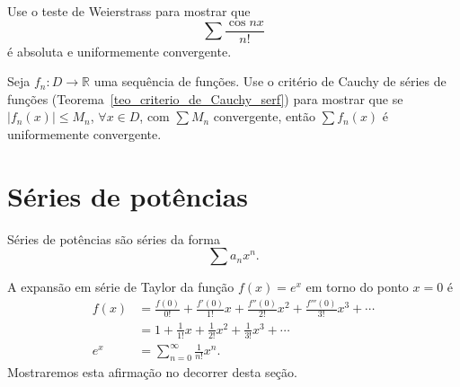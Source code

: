 \begin{exer}
  Use o teste de Weierstrass para mostrar que
  \begin{equation}
    \sum \frac{\cos nx}{n!}
  \end{equation}
é absoluta e uniformemente convergente.
\end{exer}

\begin{exer}
  Seja $f_n:D\to\mathbb{R}$ uma sequência de funções. Use o critério de Cauchy de séries de funções (Teorema~\ref{teo_criterio_de_Cauchy_serf}) para mostrar que se $|f_n(x)|\leq M_n$, $\forall x\in D$, com $\sum M_n$ convergente, então $\sum f_n(x)$ é uniformemente convergente.
\end{exer}

\section{Séries de potências}\label{cap_ssfuncoes_sec_ser_pot}

Séries de potências são séries da forma
\begin{equation}
  \sum a_nx^n.
\end{equation}

\begin{ex}
  A expansão em série de Taylor da função $f(x)=e^x$ em torno do ponto $x=0$ é
  \begin{align}
    f(x) &= \frac{f(0)}{0!} + \frac{f'(0)}{1!}x + \frac{f''(0)}{2!}x^2 + \frac{f'''(0)}{3!}x^3 + \cdots\\
    &= 1 + \frac{1}{1!}x + \frac{1}{2!}x^2 + \frac{1}{3!}x^3 + \cdots\\
    e^{x} &= \sum_{n=0}^\infty \frac{1}{n!}x^n.
  \end{align}
Mostraremos esta afirmação no decorrer desta seção.
\end{ex}

